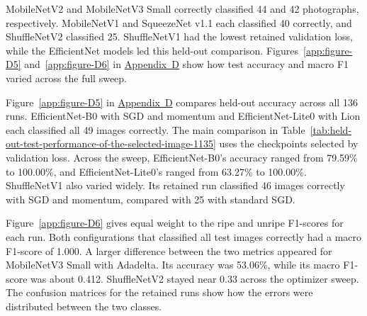 \begin{thesisprose}
MobileNetV2 and MobileNetV3 Small correctly classified 44 and 42 photographs, respectively. MobileNetV1 and SqueezeNet v1.1 each classified 40 correctly, and ShuffleNetV2 classified 25. ShuffleNetV1 had the lowest retained validation loss, while the EfficientNet models led this held-out comparison. Figures~\ref{app:figure-D5} and~\ref{app:figure-D6} in \hyperref[app:section-D]{Appendix~D} show how test accuracy and macro F1 varied across the full sweep.

Figure~\ref{app:figure-D5} in \hyperref[app:section-D]{Appendix~D} compares held-out accuracy across all 136 runs. EfficientNet-B0 with SGD and momentum and EfficientNet-Lite0 with Lion each classified all 49 images correctly. The main comparison in Table~\ref{tab:held-out-test-performance-of-the-selected-image-1135} uses the checkpoints selected by validation loss. Across the sweep, EfficientNet-B0’s accuracy ranged from 79.59\% to 100.00\%, and EfficientNet-Lite0’s ranged from 63.27\% to 100.00\%. ShuffleNetV1 also varied widely. Its retained run classified 46 images correctly with SGD and momentum, compared with 25 with standard SGD.

Figure~\ref{app:figure-D6} gives equal weight to the ripe and unripe F1-scores for each run. Both configurations that classified all test images correctly had a macro F1-score of 1.000. A larger difference between the two metrics appeared for MobileNetV3 Small with Adadelta. Its accuracy was 53.06\%, while its macro F1-score was about 0.412. ShuffleNetV2 stayed near 0.33 across the optimizer sweep. The confusion matrices for the retained runs show how the errors were distributed between the two classes.


\end{thesisprose}

